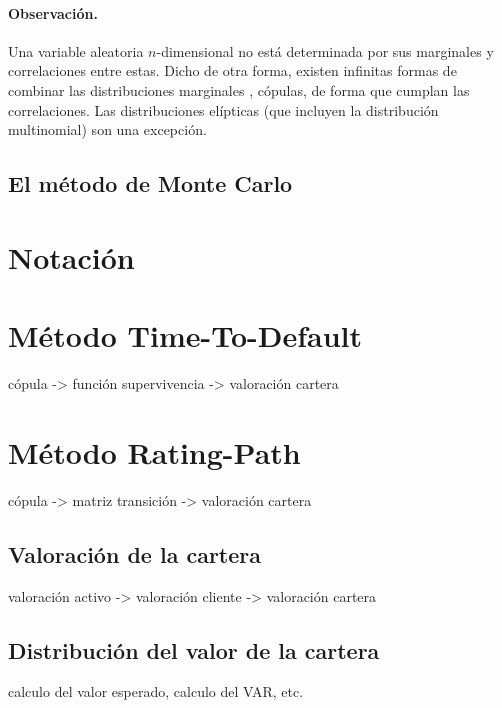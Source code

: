 \paragraph{Observaci\'on.} Una variable aleatoria $n$-dimensional no est\'a 
determinada por sus marginales y correlaciones entre estas. Dicho de otra
forma, existen infinitas formas de combinar las distribuciones marginales
, c\'opulas, de forma que cumplan las correlaciones. Las distribuciones 
el\'ipticas (que incluyen la distribuci\'on multinomial) son una excepci\'on. 


\subsection{El m\'etodo de Monte Carlo}


\section{Notaci\'on}


\section{M\'etodo Time-To-Default}
c\'opula -> funci\'on supervivencia -> valoraci\'on cartera

\section{M\'etodo Rating-Path}
c\'opula -> matriz transici\'on -> valoraci\'on cartera


\subsection{Valoraci\'on de la cartera}
valoraci\'on activo -> valoraci\'on cliente -> valoraci\'on cartera

\subsection{Distribuci\'on del valor de la cartera}
calculo del valor esperado, calculo del VAR, etc.

